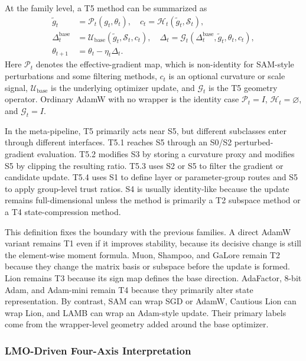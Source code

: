 At the family level, a T5 method can be summarized as
\begin{align}
  \tilde{g}_t
  &=
  \mathcal{P}_t(g_t,\theta_t),\quad
  c_t =
  \mathcal{H}_t(\tilde{g}_t,\mathcal{S}_t), \\
  \Delta_t^{\mathrm{base}}
  &=
  \mathcal{U}_{\mathrm{base}}(\tilde{g}_t,\mathcal{S}_t,c_t),\quad
  \Delta_t =
  \mathcal{G}_t(\Delta_t^{\mathrm{base}},\tilde{g}_t,\theta_t,c_t), \\
  \theta_{t+1}
  &=
  \theta_t-\eta_t\Delta_t .
  \label{eq:t5-family-template}
\end{align}
Here $\mathcal{P}_t$ denotes the effective-gradient map, which is non-identity for SAM-style perturbations and some filtering methods, $c_t$ is an optional curvature or scale signal, $\mathcal{U}_{\mathrm{base}}$ is the underlying optimizer update, and $\mathcal{G}_t$ is the T5 geometry operator.  Ordinary AdamW with no wrapper is the identity case
$\mathcal{P}_t=I$, $\mathcal{H}_t=\varnothing$, and $\mathcal{G}_t=I$.

In the meta-pipeline, T5 primarily acts near S5, but different subclasses
enter through different interfaces.  T5.1 reaches S5 through an S0/S2
perturbed-gradient evaluation.  T5.2 modifies S3 by storing a curvature proxy
and modifies S5 by clipping the resulting ratio.  T5.3 uses S2 or S5 to filter
the gradient or candidate update.  T5.4 uses S1 to define layer or
parameter-group routes and S5 to apply group-level trust ratios.  S4 is
usually identity-like because the update remains full-dimensional unless the
method is primarily a T2 subspace method or a T4 state-compression method.

This definition fixes the boundary with the previous families.  A direct
AdamW variant remains T1 even if it improves stability, because its decisive
change is still the element-wise moment formula.  Muon, Shampoo, and GaLore
remain T2 because they change the matrix basis or subspace before the update
is formed.  Lion remains T3 because its sign map defines the base direction.
AdaFactor, 8-bit Adam, and Adam-mini remain T4 because they primarily alter
state representation.  By contrast, SAM can wrap SGD or AdamW, Cautious Lion
can wrap Lion, and LAMB can wrap an Adam-style update.  Their primary labels
come from the wrapper-level geometry added around the base optimizer.

\subsubsection{LMO-Driven Four-Axis Interpretation}
\label{sec:t5-lmo-four-axis}

